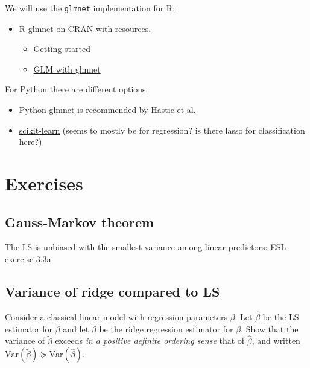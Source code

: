 \documentclass[
  letterpaper,
  DIV=11,
  numbers=noendperiod]{scrartcl}
\providecommand{\tightlist}{%
  \setlength{\itemsep}{0pt}\setlength{\parskip}{0pt}}\usepackage{longtable,booktabs,array}
\begin{document}
We will use the \texttt{glmnet} implementation for R:

\begin{itemize}
\tightlist
\item
  \href{https://cran.r-project.org/web/packages/glmnet/index.html}{R
  glmnet on CRAN} with
  \href{http://www.stanford.edu/~hastie/glmnet}{resources}.

  \begin{itemize}
  \tightlist
  \item
    \href{https://glmnet.stanford.edu/articles/glmnet.html}{Getting
    started}
  \item
    \href{https://glmnet.stanford.edu/articles/glmnetFamily.html}{GLM
    with glmnet}
  \end{itemize}
\end{itemize}

For Python there are different options.

\begin{itemize}
\tightlist
\item
  \href{https://web.stanford.edu/~hastie/glmnet_python/}{Python glmnet}
  is recommended by Hastie et al.
\item
  \href{https://scikit-learn.org/stable/modules/linear_model.html\#ridge-regression-and-classification}{scikit-learn}
  (seems to mostly be for regression? is there lasso for classification
  here?)
\end{itemize}

\hypertarget{exercises}{%
\section{Exercises}\label{exercises}}

\hypertarget{gauss-markov-theorem}{%
\subsection{Gauss-Markov theorem}\label{gauss-markov-theorem}}

The LS is unbiased with the smallest variance among linear predictors:
ESL exercise 3.3a

\hypertarget{variance-of-ridge-compared-to-ls}{%
\subsection{Variance of ridge compared to
LS}\label{variance-of-ridge-compared-to-ls}}

Consider a classical linear model with regression parameters \(\beta\).
Let \(\hat{\beta}\) be the LS estimator for \(\beta\) and let
\(\tilde{\beta}\) be the ridge regression estimator for \(\beta\). Show
that the variance of \(\tilde{\beta}\) exceeds \emph{in a positive
definite ordering sense} that of \(\hat{\beta}\), and written
\(\text{Var}(\tilde{\beta}) \succeq \text{Var}(\hat{\beta})\).
\end{document}

